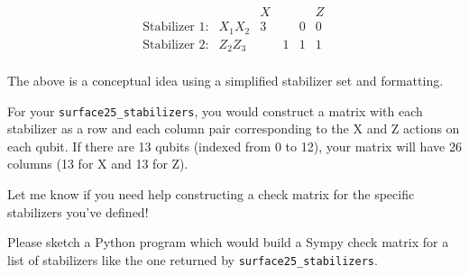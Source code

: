 \begin{airesult}
\[
\begin{array}{ccc|ccc}
 & & X\, & & & Z\,\\
\hline
\text{Stabilizer 1}: & X_1 X_2 & 3& & 0 & 0 \\
\text{Stabilizer 2}: & Z_2 Z_3 & & 1 & 1 & 1 \\
\end{array}
\]

The above is a conceptual idea using a simplified stabilizer set and formatting.

For your \verb|surface25_stabilizers|, you would construct a matrix with each stabilizer as a row
and each column pair corresponding to the X and Z actions on each qubit. If there are 13 qubits
(indexed from 0 to 12), your matrix will have 26 columns (13 for X and 13 for Z).

Let me know if you need help constructing a check matrix for the specific stabilizers you've
defined!
\end{airesult}


\begin{ai}
Please sketch a Python program which would build a Sympy check
matrix for a list of stabilizers like the one returned by \verb|surface25_stabilizers|.
\end{ai}

